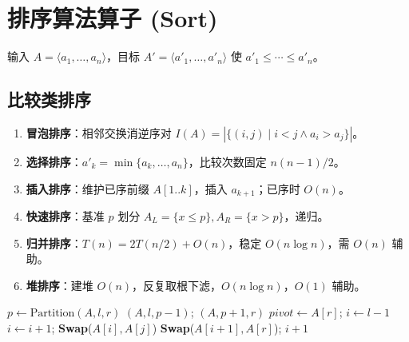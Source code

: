 \newpage

\section{排序算法算子 (Sort)}

输入 $A=\langle a_1,\dots,a_n\rangle$，目标 $A'=\langle a'_1,\dots,a'_n\rangle$ 使 $a'_1\le\cdots\le a'_n$。

\subsection{比较类排序}
\begin{enumerate}
    \item \textbf{冒泡排序}：相邻交换消逆序对 $I(A)=|\{(i,j)\mid i<j\land a_i>a_j\}|$。
    \item \textbf{选择排序}：$a'_k=\min\{a_k,\dots,a_n\}$，比较次数固定 $n(n-1)/2$。
    \item \textbf{插入排序}：维护已序前缀 $A[1..k]$，插入 $a_{k+1}$；已序时 $O(n)$。
    \item \textbf{快速排序}：基准 $p$ 划分 $A_L=\{x\le p\},A_R=\{x>p\}$，递归。
    \item \textbf{归并排序}：$T(n)=2T(n/2)+O(n)$，稳定 $O(n\log n)$，需 $O(n)$ 辅助。
    \item \textbf{堆排序}：建堆 $O(n)$，反复取根下滤，$O(n\log n)$，$O(1)$ 辅助。
\end{enumerate}

\begin{algorithm}[H]
\caption{快速排序规约}
\begin{algorithmic}[1]
     \Return \EndIf
    \State $p\gets\text{Partition}(A,l,r)$
    \State {}$(A,l,p-1)$; $(A,p+1,r)$
\EndProcedure
{}
    \State $pivot\gets A[r]$; $i\gets l-1$
         $i\gets i+1$; \textbf{Swap}($A[i],A[j]$) \EndIf
    \EndFor
    \State \textbf{Swap}($A[i+1],A[r]$); \Return $i+1$
\EndProcedure
\end{algorithmic}
\end{algorithm}

